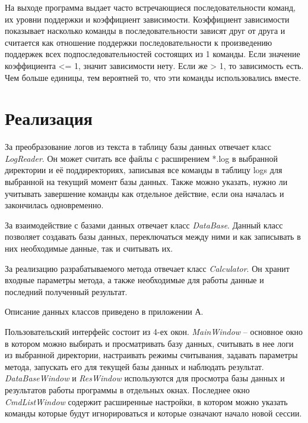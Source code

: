 На выходе программа выдает часто встречающиеся последовательности команд, их уровни поддержки и коэффициент зависимости.
Коэффициент зависимости показывает насколько команды в последовательности зависят друг от друга и считается как отношение поддержки последовательности к произведению поддержек всех подпоследовательностей состоящих из 1 команды. Если значение коэффициента <= 1, значит зависимости нету. Если же > 1, то зависимость есть. Чем больше единицы, тем вероятней то, что эти команды использовались вместе.

\section{Реализация}
За преобразование логов из текста в таблицу базы данных отвечает класс \textit{LogReader}.
Он может считать все файлы с расширением *.log в выбранной директории и её поддиректориях, записывая все команды в таблицу logs для выбранной на текущий момент базы данных. Также можно указать, нужно ли учитывать завершение команды как отдельное действие, если она началась и закончилась одновременно.

За взаимодействие с базами данных отвечает класс \textit{DataBase}.
Данный класс позволяет создавать базы данных,
переключаться между ними и как записывать в них необходимые данные, так и считывать их.

За реализацию разрабатываемого метода отвечает
класс \textit{Calculator}.
Он хранит входные параметры метода, а также необходимые для работы данные и последний полученный результат.

 Описание данных классов приведено в приложении А.


Пользовательский интерфейс состоит из 4-ех окон. \textit{MainWindow} -- основное окно в котором можно выбирать и просматривать базу данных, считывать в нее логи из выбранной директории, настраивать режимы считывания, задавать параметры метода, запускать его для текущей базы данных и наблюдать результат. \textit{DataBaseWindow} и \textit{ResWindow} используются для просмотра базы данных и результатов работы программы в отдельных окнах. Последнее окно \textit{CmdListWindow} содержит расширенные настройки, в котором можно указать команды которые будут игнорироваться и которые означают начало новой сессии.

